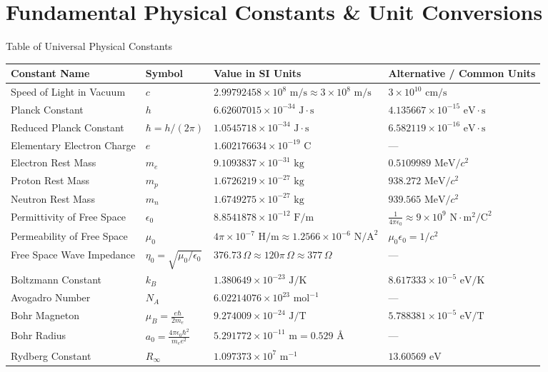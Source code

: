 \chapter{Fundamental Physical Constants \& Unit Conversions}

\begin{constantbox}{Table of Universal Physical Constants}
\begin{tabularx}{\textwidth}{l l l X}
\toprule
\textbf{Constant Name} & \textbf{Symbol} & \textbf{Value in SI Units} & \textbf{Alternative / Common Units} \\
\midrule
Speed of Light in Vacuum & $c$ & $2.99792458 \times 10^8\text{ m/s} \approx 3 \times 10^8\text{ m/s}$ & $3 \times 10^{10}\text{ cm/s}$ \\
Planck Constant & $h$ & $6.62607015 \times 10^{-34}\text{ J}\cdot\text{s}$ & $4.135667 \times 10^{-15}\text{ eV}\cdot\text{s}$ \\
Reduced Planck Constant & $\hbar = h/(2\pi)$ & $1.0545718 \times 10^{-34}\text{ J}\cdot\text{s}$ & $6.582119 \times 10^{-16}\text{ eV}\cdot\text{s}$ \\
Elementary Electron Charge & $e$ & $1.602176634 \times 10^{-19}\text{ C}$ & --- \\
Electron Rest Mass & $m_e$ & $9.1093837 \times 10^{-31}\text{ kg}$ & $0.5109989\text{ MeV}/c^2$ \\
Proton Rest Mass & $m_p$ & $1.6726219 \times 10^{-27}\text{ kg}$ & $938.272\text{ MeV}/c^2$ \\
Neutron Rest Mass & $m_n$ & $1.6749275 \times 10^{-27}\text{ kg}$ & $939.565\text{ MeV}/c^2$ \\
Permittivity of Free Space & $\epsilon_0$ & $8.8541878 \times 10^{-12}\text{ F/m}$ & $\frac{1}{4\pi\epsilon_0} \approx 9 \times 10^9\text{ N}\cdot\text{m}^2/\text{C}^2$ \\
Permeability of Free Space & $\mu_0$ & $4\pi \times 10^{-7}\text{ H/m} \approx 1.2566 \times 10^{-6}\text{ N/A}^2$ & $\mu_0 \epsilon_0 = 1/c^2$ \\
Free Space Wave Impedance & $\eta_0 = \sqrt{\mu_0/\epsilon_0}$ & $376.73\,\Omega \approx 120\pi\,\Omega \approx 377\,\Omega$ & --- \\
Boltzmann Constant & $k_B$ & $1.380649 \times 10^{-23}\text{ J/K}$ & $8.617333 \times 10^{-5}\text{ eV/K}$ \\
Avogadro Number & $N_A$ & $6.02214076 \times 10^{23}\text{ mol}^{-1}$ & --- \\
Bohr Magneton & $\mu_B = \frac{e\hbar}{2m_e}$ & $9.274009 \times 10^{-24}\text{ J/T}$ & $5.788381 \times 10^{-5}\text{ eV/T}$ \\
Bohr Radius & $a_0 = \frac{4\pi\epsilon_0\hbar^2}{m_e e^2}$ & $5.291772 \times 10^{-11}\text{ m} = 0.529\text{ \AA}$ & --- \\
Rydberg Constant & $R_\infty$ & $1.097373 \times 10^7\text{ m}^{-1}$ & $13.60569\text{ eV}$ \\
\bottomrule
\end{tabularx}
\end{constantbox}

